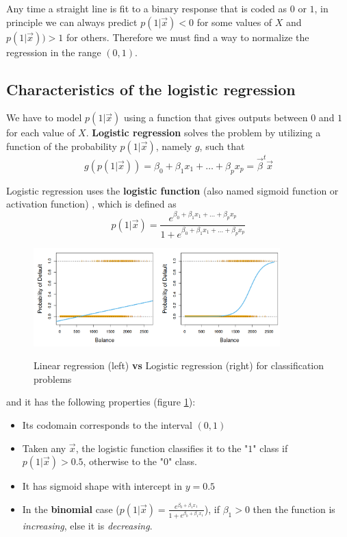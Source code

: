 	Any time a straight line is fit to a binary response that is coded as $0$ or $1$, in principle we can always predict $p(1 | \vec{x}) < 0$ for some values of $X$ and $p(1 | \vec{x})) > 1$ for others.
    Therefore we must find a way to normalize the regression in the range $(0,1)$.
    
    \subsection{Characteristics of the logistic regression}
    We have to model $p(1 | \vec{x})$ using a function that gives outputs between $ 0 $ and $1$ for each value of $X$.
    \textbf{Logistic regression} solves the problem by utilizing a function of the probability $p(1|\vec{x})$, namely $g$, such that
    $$g(p(1|\vec{x})) = \beta_0 + \beta_1 x_1 + \dots + \beta_px_p = \vec{\beta}^t\vec{x}$$
    
    Logistic regression uses the \textbf{logistic function} (also named sigmoid function or activation function) , which is defined as
    $$p(1|\vec{x}) = \frac{e^{\beta_0 + \beta_1 x_1 + \dots + \beta_p x_p}}
                          {1+e^{\beta_0 + \beta_1 x_1 + \dots + \beta_p x_p}}$$                          
               
\begin{figure}[h]
\caption{Linear regression (left) \textbf{vs} Logistic regression (right) for classification problems}
\centering
\includegraphics[width=0.85\textwidth]{LogisticReg}
\label{LogvsReg}
\end{figure}           
                          
    and it has the following properties (figure \ref{LogvsReg}):
    \begin{itemize}
      \item Its codomain corresponds to the interval $(0,1)$
      \item Taken any $ \vec{x} $, the logistic function classifies it to the "$1$" class if $p(1|\vec{x}) > 0.5$, otherwise to the "$0$" class.
      \item It has sigmoid shape with intercept in $y=0.5$
      \item In the \textbf{binomial} case ($p(1|\vec{x}) = \frac{e^{\beta_0 + \beta_1 x_1}}{1+e^{\beta_0 + \beta_1 x_1}}$), if $\beta_{1} > 0$ then the function is \textit{increasing}, else it is \textit{decreasing}.
    \end{itemize}
    
